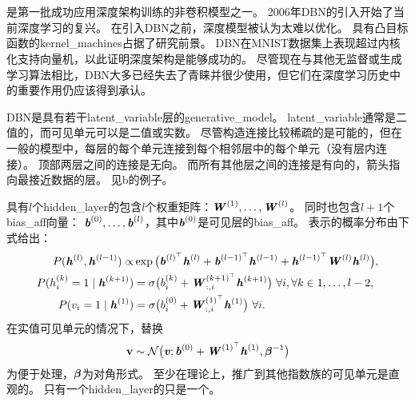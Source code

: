 
\section{}
\label{sec:deep_belief_networks}

是第一批成功应用深度架构训练的非卷积模型之一\citep{Hinton06,hinton2007learning}。
2006年\gls{DBN}的引入开始了当前深度学习的复兴。
在引入\gls{DBN}之前，深度模型被认为太难以优化。
具有凸目标函数的\gls{kernel_machines}占据了研究前景。
\gls{DBN}在MNIST数据集上表现超过内核化支持向量机，以此证明深度架构是能够成功的\citep{Hinton06}。
尽管现在与其他无监督或生成学习算法相比，\gls{DBN}大多已经失去了青睐并很少使用，但它们在深度学习历史中的重要作用仍应该得到承认。

\gls{DBN}是具有若干\gls{latent_variable}层的\gls{generative_model}。
\gls{latent_variable}通常是二值的，而可见单元可以是二值或实数。
尽管构造连接比较稀疏的是可能的，但在一般的模型中，每层的每个单元连接到每个相邻层中的每个单元（没有层内连接）。
顶部两层之间的连接是无向。
而所有其他层之间的连接是有向的，箭头指向最接近数据的层。
见b的例子。


具有$l$个\gls{hidden_layer}的包含$l$个权重矩阵：$\boldsymbol{\mathit{W}}^{(1)},\ldots, \boldsymbol{\mathit{W}}^{(l)}$。
同时也包含$l+1$个\gls{bias_aff}向量：
$\boldsymbol{\mathit{b}}^{(0)},\ldots,\boldsymbol{\mathit{b}}^{(l)}$，其中$\boldsymbol{\mathit{b}}^{(0)}$是可见层的\gls{bias_aff}。
表示的概率分布由下式给出：
\begin{align}
 P(\boldsymbol{\mathit{h}}^{(l)}, \boldsymbol{\mathit{h}}^{(l-1)}) \propto& \exp \big( \boldsymbol{\mathit{b}}^{(l)^\top} \boldsymbol{\mathit{h}}^{(l)} +  \boldsymbol{\mathit{b}}^{(l-1)^\top} \boldsymbol{\mathit{h}}^{(l-1)}
 + \boldsymbol{\mathit{h}}^{(l-1)^\top} \boldsymbol{\mathit{W}}^{(l)} \boldsymbol{\mathit{h}}^{(l)} \big), \\
 P(h_i^{(k)} = 1  \mid  \boldsymbol{\mathit{h}}^{(k+1)}) &= \sigma \big( b_i^{(k)} + \boldsymbol{\mathit{W}}_{:,i}^{(k+1)^\top} \boldsymbol{\mathit{h}}^{(k+1)} 
                                                          \big)~ \forall i,  \forall k \in 1, \ldots, l-2, \\
P(v_i = 1  \mid  \boldsymbol{\mathit{h}}^{(1)}) &=  \sigma \big( b_i^{(0)} + \boldsymbol{\mathit{W}}_{:,i}^{(1)^\top} \boldsymbol{\mathit{h}}^{(1)} 
                                                          \big)~ \forall i.
\end{align}
在实值可见单元的情况下，替换
\begin{align}
 \mathbf{v} \sim \mathcal{N} \big( \boldsymbol{\mathit{v}}; \boldsymbol{\mathit{b}}^{(0)} + \boldsymbol{\mathit{W}}^{(1)^\top} \boldsymbol{\mathit{h}}^{(1)}, \boldsymbol{\beta}^{-1} \big)
\end{align}
为便于处理，$\boldsymbol{\beta}$为对角形式。
至少在理论上，推广到其他指数族的可见单元是直观的。
只有一个\gls{hidden_layer}的只是一个。

